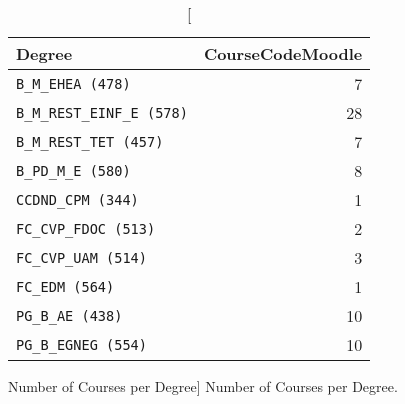 \begin{table}[h!]
    \centering

    \begin{tabular}{l r}
        Degree                             & CourseCodeMoodle \\ \hline
        \texttt{B\_M\_EHEA (478)}          & 7                \\
        \texttt{B\_M\_REST\_EINF\_E (578)} & 28               \\
        \texttt{B\_M\_REST\_TET (457)}     & 7                \\
        \texttt{B\_PD\_M\_E (580)}         & 8                \\
        \texttt{CCDND\_CPM (344)}          & 1                \\
        \texttt{FC\_CVP\_FDOC (513)}       & 2                \\
        \texttt{FC\_CVP\_UAM (514)}        & 3                \\
        \texttt{FC\_EDM (564)}             & 1                \\
        \texttt{PG\_B\_AE (438)}           & 10               \\
        \texttt{PG\_B\_EGNEG (554)}        & 10               \\
    \end{tabular}

    \caption
        [Number of Courses per Degree]
        {Number of Courses per Degree.}

    \label{tab:stat_003_res_1}
\end{table}

